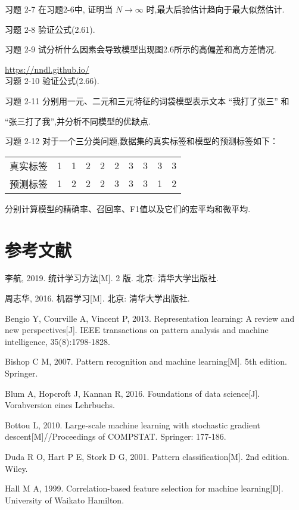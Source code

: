 \documentclass[10pt]{article}
\begin{document}
习题 2-7 在习题2-6中, 证明当 $N \rightarrow \infty$ 时,最大后验估计趋向于最大似然估计.

习题 2-8 验证公式(2.61).

习题 2-9 试分析什么因素会导致模型出现图2.6所示的高偏差和高方差情况.

\href{https://nndl.github.io/}{https://nndl.github.io/}\\
习题 2-10 验证公式(2.66).

习题 2-11 分别用一元、二元和三元特征的词袋模型表示文本 “我打了张三” 和

“张三打了我”,并分析不同模型的优缺点.

习题 2-12 对于一个三分类问题,数据集的真实标签和模型的预测标签如下：

\begin{center}
\begin{tabular}{llllllllll}
真实标签 & 1 & 1 & 2 & 2 & 2 & 3 & 3 & 3 & 3 \\
预测标签 & 1 & 2 & 2 & 2 & 3 & 3 & 3 & 1 & 2 \\
\hline
\end{tabular}
\end{center}

分别计算模型的精确率、召回率、F1值以及它们的宏平均和微平均.

\section*{参考文献}
李航, 2019. 统计学习方法[M]. 2 版. 北京: 清华大学出版社.

周志华, 2016. 机器学习[M]. 北京: 清华大学出版社.

Bengio Y, Courville A, Vincent P, 2013. Representation learning: A review and new perspectives[J]. IEEE transactions on pattern analysis and machine intelligence, 35(8):1798-1828.

Bishop C M, 2007. Pattern recognition and machine learning[M]. 5th edition. Springer.

Blum A, Hopcroft J, Kannan R, 2016. Foundations of data science[J]. Vorabversion eines Lehrbuchs.

Bottou L, 2010. Large-scale machine learning with stochastic gradient descent[M]//Proceedings of COMPSTAT. Springer: 177-186.

Duda R O, Hart P E, Stork D G, 2001. Pattern classification[M]. 2nd edition. Wiley.

Hall M A, 1999. Correlation-based feature selection for machine learning[D]. University of Waikato Hamilton.
\end{document}
